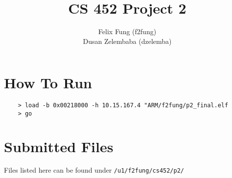 \documentclass[letterpaper]{article}
\begin{document}
\title{CS 452 Project 2}
\author{Felix Fung (f2fung) \\ Dusan Zelembaba (dzelemba)}
\maketitle

\section{How To Run}
\begin{verbatim}
	> load -b 0x00218000 -h 10.15.167.4 "ARM/f2fung/p2_final.elf
	> go
\end{verbatim}

\section{Submitted Files}

Files listed here can be found under \verb!/u1/f2fung/cs452/p2/!
\end{document}
